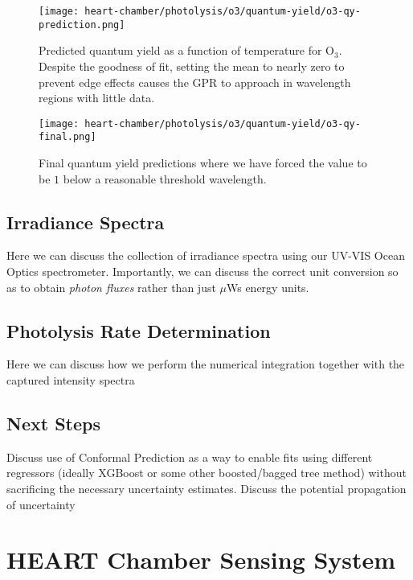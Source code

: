 \begin{figure}[h]
  \centering
  \texttt{[image: heart-chamber/photolysis/o3/quantum-yield/o3-qy-prediction.png]}
  \caption{Predicted quantum yield as a function of temperature for $\mathrm{O_3}$. Despite the goodness of fit, setting the mean to nearly zero to prevent edge effects causes the GPR to approach in wavelength regions with little data.}
  \label{fig:qy-o3-pred}
\end{figure}


\begin{figure}[h]
  \centering
  \texttt{[image: heart-chamber/photolysis/o3/quantum-yield/o3-qy-final.png]}
  \caption{Final quantum yield predictions where we have forced the value to be $1$ below a reasonable threshold wavelength.}
  \label{fig:qy-o3-final}
\end{figure}


\subsection{Irradiance Spectra}

Here we can discuss the collection of irradiance spectra using our UV-VIS Ocean Optics spectrometer. Importantly, we can discuss the correct unit conversion so as to obtain \textit{photon fluxes} rather than just $\mu$Ws energy units.

\subsection{Photolysis Rate Determination}

Here we can discuss how we perform the numerical integration together with the captured intensity spectra

\subsection{Next Steps}

Discuss use of Conformal Prediction as a way to enable fits using different regressors (ideally XGBoost or some other boosted/bagged tree method) without sacrificing the necessary uncertainty estimates. Discuss the potential propagation of uncertainty



\section{HEART Chamber Sensing System}



